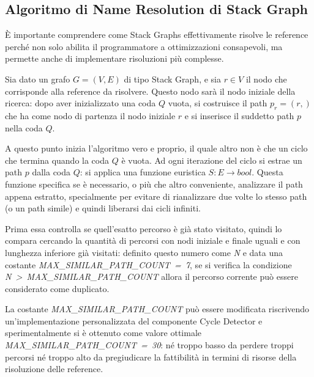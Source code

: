 \subsection{Algoritmo di Name Resolution di Stack Graph}

\`E importante comprendere come Stack Graphs effettivamente risolve le reference perch\'e non solo abilita il programmatore a ottimizzazioni consapevoli, ma permette anche di implementare risoluzioni pi\`u complesse.

\par
Sia dato un grafo $G = (V, E)$ di tipo Stack Graph, e sia $r \in V$ il nodo che corrisponde alla reference da risolvere. Questo nodo sar\`a il nodo iniziale della ricerca: dopo aver inizializzato una coda $Q$ vuota, si costruisce il path $p_r = (r,)$ che ha come nodo di partenza il nodo iniziale $r$ e si inserisce il suddetto path $p$ nella coda $Q$.

\par
A questo punto inizia l'algoritmo vero e proprio, il quale altro non \`e che un ciclo che termina quando la coda $Q$ \`e vuota.
Ad ogni iterazione del ciclo si estrae un path $p$ dalla coda $Q$: si applica una funzione euristica $S : E \rightarrow bool$.
Questa funzione specifica se \`e necessario, o pi\`u che altro conveniente, analizzare il path appena estratto, specialmente per evitare di rianalizzare due volte lo stesso path (o un path simile) e quindi liberarsi dai cicli infiniti.

\par
\begin{sloppypar}
Prima essa controlla se quell'esatto percorso \`e gi\`a stato visitato, quindi lo compara cercando la quantit\`a di percorsi con nodi iniziale e finale uguali e con lunghezza inferiore gi\`a visitati: definito questo numero come \emph{N} e data una costante \emph{MAX\_SIMILAR\_PATH\_COUNT~=~7}, se si verifica la condizione \emph{N~>~MAX\_SIMILAR\_PATH\_COUNT} allora il percorso corrente pu\`o essere considerato come duplicato.
\end{sloppypar}

\par
\begin{sloppypar}
La costante \emph{MAX\_SIMILAR\_PATH\_COUNT} pu\`o essere modificata riscrivendo un'implementazione personalizzata del componente Cycle Detector e sperimentalmente si \`e ottenuto come valore ottimale \emph{MAX\_SIMILAR\_PATH\_COUNT~=~30}: n\'e troppo basso da perdere troppi percorsi n\'e troppo alto da pregiudicare la fattibilit\`a in termini di risorse della risoluzione delle reference.
\end{sloppypar}

